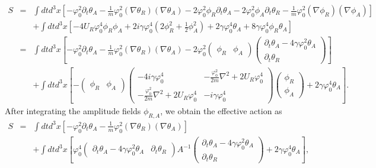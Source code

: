 \documentclass[aps,superscriptaddress,notitlepage,longbibliography]{revtex4-1}
\begin{document}
\begin{eqnarray}
S & = & \int dtd^{3}x\left[-\varphi_{0}^{2}\partial_{t}\theta_{A}-\frac{1}{m}\varphi_{0}^{2}(\nabla\theta_{R})(\nabla\theta_{A})-2\varphi_{0}^{2}\phi_{R}\partial_{t}\theta_{A}-2\varphi_{0}^{2}\phi_{A}\partial_{t}\theta_{R}-\frac{1}{m}\varphi_{0}^{2}(\nabla\phi_{R})(\nabla\phi_{A})\right]\nonumber \\
 &  & +\int dtd^{3}x\left[-4U_{R}\varphi_{0}^{4}\phi_{R}\phi_{A}+2i\gamma\varphi_{0}^{4}\left(2\phi_{R}^{2}+\frac{1}{2}\phi_{A}^{2}\right)+2\gamma\varphi_{0}^{4}\theta_{A}+8\gamma\varphi_{0}^{4}\phi_{R}\theta_{A}\right]\nonumber \\
 & = & \int dtd^{3}x\left[-\varphi_{0}^{2}\partial_{t}\theta_{A}-\frac{1}{m}\varphi_{0}^{2}(\nabla\theta_{R})(\nabla\theta_{A})-2\varphi_{0}^{2}\left(\begin{array}{cc}
\phi_{R} & \phi_{A}\end{array}\right)\left(\begin{array}{c}
\partial_{t}\theta_{A}-4\gamma\varphi_{0}^{2}\theta_{A}\\
\partial_{t}\theta_{R}
\end{array}\right)\right]\nonumber \\
 &  & +\int dtd^{3}x\left[-\left(\begin{array}{cc}
\phi_{R} & \phi_{A}\end{array}\right)\left(\begin{array}{cc}
-4i\gamma\varphi_{0}^{4} & -\frac{\varphi_{0}^{2}}{2m}\nabla^{2}+2U_{R}\varphi_{0}^{4}\\
-\frac{\varphi_{0}^{2}}{2m}\nabla^{2}+2U_{R}\varphi_{0}^{4} & -i\gamma\varphi_{0}^{4}
\end{array}\right)\left(\begin{array}{c}
\phi_{R}\\
\phi_{A}
\end{array}\right)+2\gamma\varphi_{0}^{4}\theta_{A}\right].
\end{eqnarray}
After integrating the amplitude fields $\phi_{R,A}$, we obtain the
effective action as 
\begin{eqnarray}
S & = & \int dtd^{3}x\left[-\varphi_{0}^{2}\partial_{t}\theta_{A}-\frac{1}{m}\varphi_{0}^{2}(\nabla\theta_{R})(\nabla\theta_{A})\right]\nonumber \\
 &  & +\int dtd^{3}x\left[\varphi_{0}^{4}\left(\begin{array}{cc}
\partial_{t}\theta_{A}-4\gamma\varphi_{0}^{2}\theta_{A} & \partial_{t}\theta_{R}\end{array}\right)A^{-1}\left(\begin{array}{c}
\partial_{t}\theta_{A}-4\gamma\varphi_{0}^{2}\theta_{A}\\
\partial_{t}\theta_{R}
\end{array}\right)+2\gamma\varphi_{0}^{4}\theta_{A}\right],
\end{eqnarray}
\end{document}
